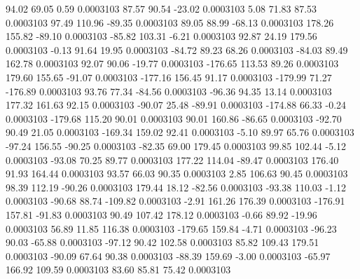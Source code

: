        94.02       69.05        0.59     0.0003103
       87.57       90.54      -23.02     0.0003103
        5.08       71.83       87.53     0.0003103
       97.49      110.96      -89.35     0.0003103
       89.05       88.99      -68.13     0.0003103
      178.26      155.82      -89.10     0.0003103
      -85.82      103.31       -6.21     0.0003103
       92.87       24.19      179.56     0.0003103
       -0.13       91.64       19.95     0.0003103
      -84.72       89.23       68.26     0.0003103
      -84.03       89.49      162.78     0.0003103
       92.07       90.06      -19.77     0.0003103
     -176.65      113.53       89.26     0.0003103
      179.60      155.65      -91.07     0.0003103
     -177.16      156.45       91.17     0.0003103
     -179.99       71.27     -176.89     0.0003103
       93.76       77.34      -84.56     0.0003103
      -96.36       94.35       13.14     0.0003103
      177.32      161.63       92.15     0.0003103
      -90.07       25.48      -89.91     0.0003103
     -174.88       66.33       -0.24     0.0003103
     -179.68      115.20       90.01     0.0003103
       90.01      160.86      -86.65     0.0003103
      -92.70       90.49       21.05     0.0003103
     -169.34      159.02       92.41     0.0003103
       -5.10       89.97       65.76     0.0003103
      -97.24      156.55      -90.25     0.0003103
      -82.35       69.00      179.45     0.0003103
       99.85      102.44       -5.12     0.0003103
      -93.08       70.25       89.77     0.0003103
      177.22      114.04      -89.47     0.0003103
      176.40       91.93      164.44     0.0003103
       93.57       66.03       90.35     0.0003103
        2.85      106.63       90.45     0.0003103
       98.39      112.19      -90.26     0.0003103
      179.44       18.12      -82.56     0.0003103
      -93.38      110.03       -1.12     0.0003103
      -90.68       88.74     -109.82     0.0003103
       -2.91      161.26      176.39     0.0003103
     -176.91      157.81      -91.83     0.0003103
       90.49      107.42      178.12     0.0003103
       -0.66       89.92      -19.96     0.0003103
       56.89       11.85      116.38     0.0003103
     -179.65      159.84       -4.71     0.0003103
      -96.23       90.03      -65.88     0.0003103
      -97.12       90.42      102.58     0.0003103
       85.82      109.43      179.51     0.0003103
      -90.09       67.64       90.38     0.0003103
      -88.39      159.69       -3.00     0.0003103
      -65.97      166.92      109.59     0.0003103
       83.60       85.81       75.42     0.0003103
